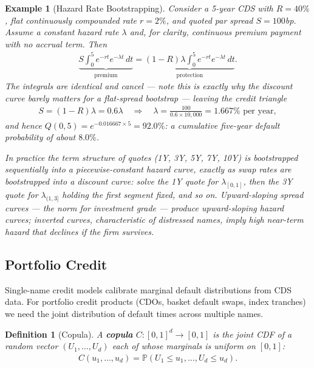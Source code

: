\documentclass{report}
\theoremstyle{spacedplain}
\theoremstyle{spaceddefinition}
\newtheorem{definition}[theorem]{Definition}
\newtheorem{example}[theorem]{Example}
\theoremstyle{spacedremark}
\begin{document}
\begin{example}[Hazard Rate Bootstrapping]
    Consider a 5-year CDS with $R = 40\%$, flat continuously compounded rate $r = 2\%$, and quoted par spread $S = 100$bp. Assume a constant hazard rate $\lambda$ and, for clarity, continuous premium payment with no accrual term. Then
    \begin{align}
        \underbrace{S\int_0^5 e^{-rt}e^{-\lambda t}\,dt}_{\text{premium}} = \underbrace{(1-R)\lambda\int_0^5 e^{-rt}e^{-\lambda t}\,dt}_{\text{protection}}.
    \end{align}
    The integrals are identical and cancel --- note this is exactly why the discount curve barely matters for a flat-spread bootstrap --- leaving the credit triangle
    \begin{align}
        S = (1-R)\lambda = 0.6\lambda \quad\Longrightarrow\quad \lambda = \frac{100}{0.6\times 10{,}000} = 1.667\%\text{ per year},
    \end{align}
    and hence $Q(0,5) = e^{-0.016667\times 5} = 92.0\%$: a cumulative five-year default probability of about $8.0\%$.

    In practice the term structure of quotes (1Y, 3Y, 5Y, 7Y, 10Y) is bootstrapped sequentially into a piecewise-constant hazard curve, exactly as swap rates are bootstrapped into a discount curve: solve the 1Y quote for $\lambda_{[0,1]}$, then the 3Y quote for $\lambda_{(1,3]}$ holding the first segment fixed, and so on. Upward-sloping spread curves --- the norm for investment grade --- produce upward-sloping hazard curves; inverted curves, characteristic of distressed names, imply high near-term hazard that declines if the firm survives.
\end{example}


\subsection{Portfolio Credit}

Single-name credit models calibrate marginal default distributions from CDS data. For portfolio credit products (CDOs, basket default swaps, index tranches) we need the joint distribution of default times across multiple names.

\begin{definition}[Copula]
A \textbf{copula} $C:[0,1]^d \to [0,1]$ is the joint CDF of a random vector $(U_1, \ldots, U_d)$ each of whose marginals is uniform on $[0,1]$:
\begin{align}
    C(u_1, \ldots, u_d) = \mathbb{P}(U_1 \leq u_1, \ldots, U_d \leq u_d).
\end{align}
\end{definition}
\end{document}
